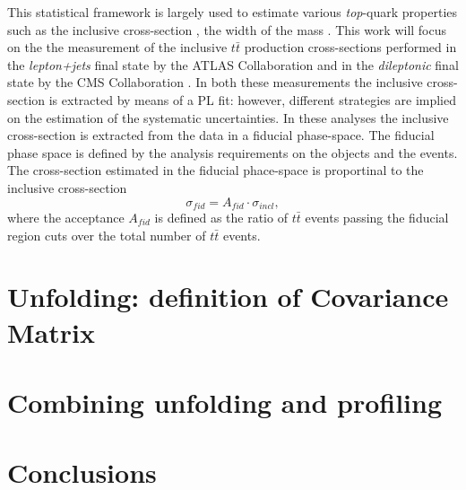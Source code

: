 \documentclass[12pt]{article}
\begin{document}
 This statistical framework is largely used to estimate various \emph{top}-quark properties such as the inclusive cross-section \cite{Aad_2020,CMS_inclusive}, the width \cite{ATLAS:2019onj} of the mass \cite{CMS_inclusive}.  
This work will focus on the the measurement of the inclusive $t\bar{t}$ production cross-sections performed in the \emph{lepton+jets} final state by the ATLAS Collaboration \cite{Aad_2020} and in the \emph{dileptonic} final state by the CMS Collaboration \cite{CMS_inclusive}. In both these measurements the inclusive cross-section is extracted by means of a PL fit: however, different strategies are implied on the estimation of the systematic uncertainties. 
In these analyses the inclusive cross-section is extracted from the data in a fiducial phase-space. The fiducial phase space is defined by the analysis requirements on the objects and the events. The cross-section estimated in the fiducial phace-space is proportinal to the inclusive cross-section
\begin{equation}
\sigma_{fid} = A_{fid} \cdot \sigma_{incl}, 
\end{equation}
where the acceptance $A_{fid}$ is defined as the ratio of $t\bar{t}$ events passing the fiducial region cuts over the total number of $t\bar{t}$ events.


\section{Unfolding: definition of Covariance Matrix}

\section{Combining unfolding and profiling}

\section{Conclusions}

\end{document}
